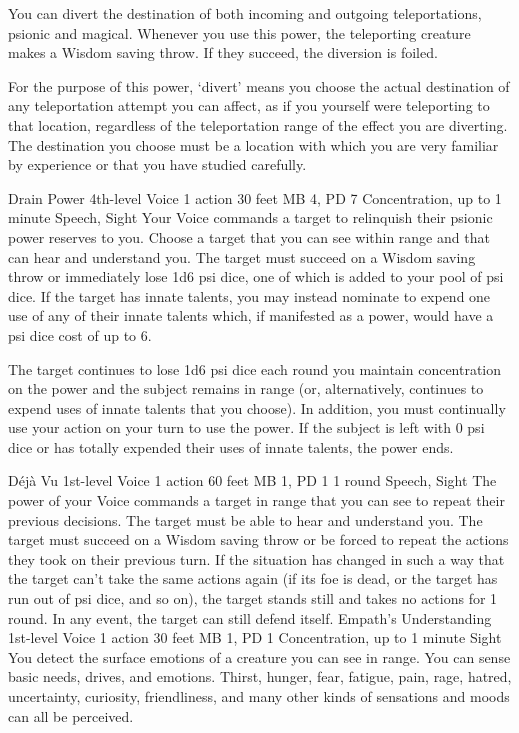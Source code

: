 You can divert the destination of both incoming and outgoing
teleportations, psionic and magical. Whenever you use this
power, the teleporting creature makes a Wisdom saving throw.
If they succeed, the diversion is foiled.

For the purpose of this power, `divert' means you choose
the actual destination of any teleportation attempt you can
affect, as if you yourself were teleporting to that location,
regardless of the teleportation range of the effect you are
diverting. The destination you choose must be a location with
which you are very familiar by experience or that you have
studied carefully.

\DndPowerHeader%
    {Drain Power\label{pwr:drain_power}}
    {4th-level Voice}
    {1 action}
    {30 feet}
    {MB 4, PD 7}
    {Concentration, up to 1 minute}
    {Speech, Sight}
Your Voice commands a target to relinquish
their psionic power reserves to you. Choose a target that
you can see within range
and that can hear and understand you.
The target must succeed on a Wisdom
saving throw or immediately lose 1d6 psi dice, one of which
is added to your pool of psi dice. If the target has innate
talents, you may instead nominate to expend one use of any
of their innate talents which,
if manifested as a power,
would have a psi dice cost of up to 6.

The target continues to lose 1d6 psi dice each round you maintain
concentration on the power and the subject remains in range
(or, alternatively, continues to expend uses of innate talents
that you choose). In addition, you must continually use your
action on your turn to use the power. If the subject is left
with 0 psi dice or has totally expended their uses of innate
talents, the power ends.

\DndPowerHeader%
    {Déjà Vu\label{pwr:déjà_vu}}
    {1st-level Voice}
    {1 action}
    {60 feet}
    {MB 1, PD 1}
    {1 round}
    {Speech, Sight}
The power of your Voice commands a target
in range that you can see to repeat their previous decisions.
The target must be able to hear and understand you.
The target must succeed on a Wisdom saving throw or be forced
to repeat the actions they took on their previous turn. If
the situation has changed in such a way that the target can't
take the same actions again (if its foe is dead, or the target
has run out of psi dice, and so on), the target stands still
and takes no actions for 1 round. In any event, the target
can still defend itself.
\DndPowerHeader%
    {Empath's Understanding\label{pwr:empaths_understanding}}
    {1st-level Voice}
    {1 action}
    {30 feet}
    {MB 1, PD 1}
    {Concentration, up to 1 minute}
    {Sight}
You detect the surface emotions of a creature
you can see in range. You can sense basic needs, drives, and
emotions. Thirst, hunger, fear, fatigue, pain, rage, hatred,
uncertainty, curiosity, friendliness, and many other kinds
of sensations and moods can all be perceived.

